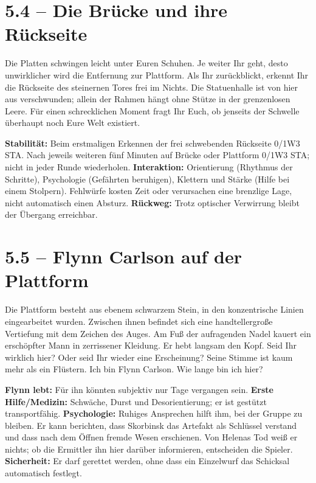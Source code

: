 \section{5.4 -- Die Brücke und ihre Rückseite}
\begin{vorlesetextalle}
Die Platten schwingen leicht unter Euren Schuhen. Je weiter Ihr geht, desto unwirklicher wird die Entfernung zur Plattform. Als Ihr zurückblickt, erkennt Ihr die Rückseite des steinernen Tores frei im Nichts. Die Statuenhalle ist von hier aus verschwunden; allein der Rahmen hängt ohne Stütze in der grenzenlosen Leere. Für einen schrecklichen Moment fragt Ihr Euch, ob jenseits der Schwelle überhaupt noch Eure Welt existiert.
\end{vorlesetextalle}
\begin{meisterinfo}
\textbf{Stabilität:} Beim erstmaligen Erkennen der frei schwebenden Rückseite 0/1W3 STA. Nach jeweils weiteren fünf Minuten auf Brücke oder Plattform 0/1W3 STA; nicht in jeder Runde wiederholen. \textbf{Interaktion:} Orientierung (Rhythmus der Schritte), Psychologie (Gefährten beruhigen), Klettern und Stärke (Hilfe bei einem Stolpern). Fehlwürfe kosten Zeit oder verursachen eine brenzlige Lage, nicht automatisch einen Absturz. \textbf{Rückweg:} Trotz optischer Verwirrung bleibt der Übergang erreichbar.
\end{meisterinfo}

\section{5.5 -- Flynn Carlson auf der Plattform}
\begin{vorlesetextalle}
Die Plattform besteht aus ebenem schwarzem Stein, in den konzentrische Linien eingearbeitet wurden. Zwischen ihnen befindet sich eine handtellergro\ss{}e Vertiefung mit dem Zeichen des Auges. Am Fu\ss{} der aufragenden Nadel kauert ein erschöpfter Mann in zerrissener Kleidung. Er hebt langsam den Kopf. \glqq{}Seid Ihr wirklich hier? Oder seid Ihr wieder eine Erscheinung?\grqq{} Seine Stimme ist kaum mehr als ein Flüstern. \glqq{}Ich bin Flynn Carlson. Wie lange bin ich hier?\grqq{}
\end{vorlesetextalle}
\begin{meisterinfo}
\textbf{Flynn lebt:} Für ihn könnten subjektiv nur Tage vergangen sein. \textbf{Erste Hilfe/Medizin:} Schwäche, Durst und Desorientierung; er ist gestützt transportfähig. \textbf{Psychologie:} Ruhiges Ansprechen hilft ihm, bei der Gruppe zu bleiben. Er kann berichten, dass Skorbinsk das Artefakt als Schlüssel verstand und dass nach dem Öffnen fremde Wesen erschienen. Von Helenas Tod wei\ss{} er nichts; ob die Ermittler ihn hier darüber informieren, entscheiden die Spieler. \textbf{Sicherheit:} Er darf gerettet werden, ohne dass ein Einzelwurf das Schicksal automatisch festlegt.
\end{meisterinfo}

